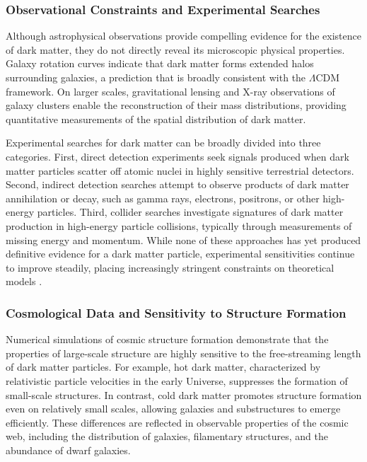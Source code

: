 \subsubsection{Observational Constraints and Experimental Searches}

Although astrophysical observations provide compelling evidence for the existence of dark matter, they do not directly reveal its microscopic physical properties. Galaxy rotation curves indicate that dark matter forms extended halos surrounding galaxies, a prediction that is broadly consistent with the $\Lambda$CDM framework. On larger scales, gravitational lensing and X-ray observations of galaxy clusters enable the reconstruction of their mass distributions, providing quantitative measurements of the spatial distribution of dark matter.

Experimental searches for dark matter can be broadly divided into three categories. First, direct detection experiments seek signals produced when dark matter particles scatter off atomic nuclei in highly sensitive terrestrial detectors. Second, indirect detection searches attempt to observe products of dark matter annihilation or decay, such as gamma rays, electrons, positrons, or other high-energy particles. Third, collider searches investigate signatures of dark matter production in high-energy particle collisions, typically through measurements of missing energy and momentum. While none of these approaches has yet produced definitive evidence for a dark matter particle, experimental sensitivities continue to improve steadily, placing increasingly stringent constraints on theoretical models \cite{billard2022}.

\subsubsection{Cosmological Data and Sensitivity to Structure Formation}

Numerical simulations of cosmic structure formation demonstrate that the properties of large-scale structure are highly sensitive to the free-streaming length of dark matter particles. For example, hot dark matter, characterized by relativistic particle velocities in the early Universe, suppresses the formation of small-scale structures. In contrast, cold dark matter promotes structure formation even on relatively small scales, allowing galaxies and substructures to emerge efficiently. These differences are reflected in observable properties of the cosmic web, including the distribution of galaxies, filamentary structures, and the abundance of dwarf galaxies.

